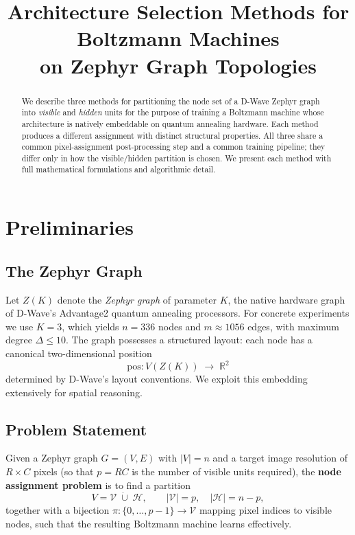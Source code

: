 \documentclass[11pt,a4paper]{article}
\title{Architecture Selection Methods for Boltzmann Machines\\on Zephyr Graph Topologies}
\author{}
\date{}
\newcommand{\VV}{\mathcal{V}}
\newcommand{\HH}{\mathcal{H}}
\newcommand{\RR}{\mathbb{R}}
\begin{document}
\maketitle

\begin{abstract}
We describe three methods for partitioning the node set of a D-Wave Zephyr graph into \emph{visible} and \emph{hidden} units for the purpose of training a Boltzmann machine whose architecture is natively embeddable on quantum annealing hardware.  Each method produces a different assignment with distinct structural properties.  All three share a common pixel-assignment post-processing step and a common training pipeline; they differ only in how the visible/hidden partition is chosen.  We present each method with full mathematical formulations and algorithmic detail.
\end{abstract}

\tableofcontents
\newpage

\section{Preliminaries}\label{sec:prelim}

\subsection{The Zephyr Graph}\label{sec:zephyr}

Let $Z(K)$ denote the \emph{Zephyr graph} of parameter $K$, the native hardware graph of D-Wave's Advantage2 quantum annealing processors.  For concrete experiments we use $K=3$, which yields $n=336$ nodes and $m\approx 1056$ edges, with maximum degree $\Delta \leq 10$.  The graph possesses a structured layout: each node has a canonical two-dimensional position
\[
  \mathrm{pos}: V(Z(K)) \;\longrightarrow\; \RR^2
\]
determined by D-Wave's layout conventions.  We exploit this embedding extensively for spatial reasoning.

\subsection{Problem Statement}\label{sec:problem}

Given a Zephyr graph $G=(V,E)$ with $|V|=n$ and a target image resolution of $R\times C$ pixels (so that $p = RC$ is the number of visible units required), the \textbf{node assignment problem} is to find a partition
\[
  V = \VV \;\dot\cup\; \HH, \qquad |\VV| = p, \quad |\HH| = n - p,
\]
together with a bijection $\pi: \{0,\ldots,p-1\} \to \VV$ mapping pixel indices to visible nodes, such that the resulting Boltzmann machine learns effectively.
\end{document}
